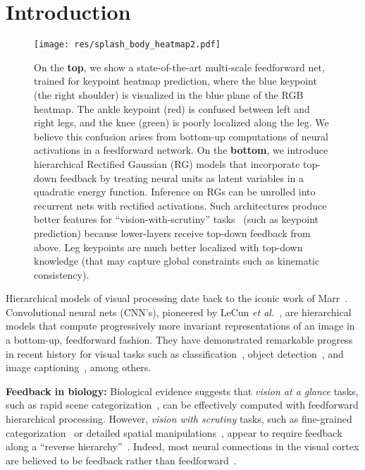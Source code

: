 \documentclass[10pt,twocolumn,letterpaper]{article}
\begin{document}
\section{Introduction}
\begin{figure}[t!]
  \centering
\texttt{[image: res/splash\_body\_heatmap2.pdf]}
\caption{On the {\bf top}, we show a state-of-the-art multi-scale
    feedforward net, trained for keypoint heatmap prediction, where
    the blue keypoint (the right shoulder) is visualized in the blue
    plane of the RGB heatmap. The ankle keypoint (red) is confused
    between left and right legs, and the knee (green) is poorly
    localized along the leg. We believe this confusion arises from
    bottom-up computations of neural activations in a feedforward
    network. On the {\bf bottom}, we introduce hierarchical Rectified
    Gaussian (RG) models that incorporate top-down feedback by
    treating neural units as latent variables in a quadratic energy
    function. Inference on RGs can be unrolled into recurrent nets
    with rectified activations. Such architectures produce better
    features for ``vision-with-scrutiny''
    tasks~\cite{hochstein2002view} (such as keypoint prediction)
    because lower-layers receive top-down feedback from above. Leg
    keypoints are much better localized with top-down knowledge (that
    may capture global constraints such as kinematic
    consistency).}\label{fig:splash}
\end{figure}
Hierarchical models of visual processing date back to the iconic work
of Marr~\cite{marr1982vision}.  Convolutional neural nets (CNN's),
pioneered by LeCun {\em et al.}~\cite{lecun1998gradient}, are
hierarchical models that compute progressively more invariant
representations of an image in a bottom-up, feedforward fashion. They
have demonstrated remarkable progress in recent history for visual
tasks such as classification~\cite{krizhevsky2012imagenet,
  simonyan2014very, szegedy2014going}, object
detection~\cite{girshick2014rich}, and image
captioning~\cite{karpathy2014deep}, among others.

{\bf Feedback in biology:} Biological evidence suggests that {\em vision at a glance} tasks, such
as rapid scene categorization~\cite{vanrullen2001bird}, can be
effectively computed with feedforward hierarchical
processing. However, {\em vision with scrutiny} tasks, such as
fine-grained categorization~\cite{kosslyn1995topographical} or
detailed spatial manipulations~\cite{ito1999attention}, appear to
require feedback along a ``reverse
hierarchy''~\cite{hochstein2002view}. Indeed, most neural connections
in the visual cortex are believed to be feedback rather than
feedforward~\cite{douglas1995recurrent, kruger2013deep}. 
\end{document}
